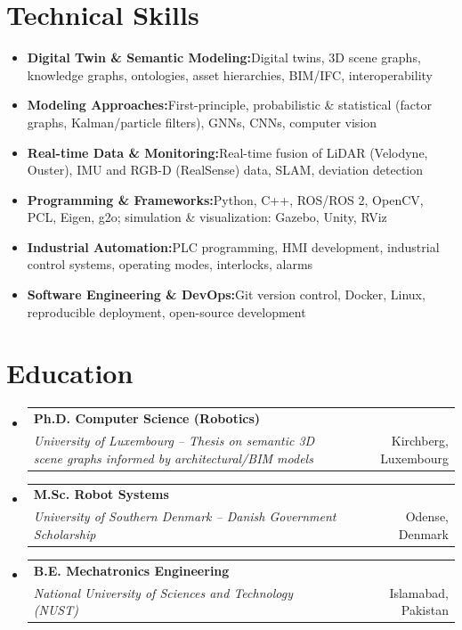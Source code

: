 \documentclass[a4paper,11pt]{article}
\makeatletter
\newcommand{\resumeItem}[2]{
  \item{
    \textbf{#1}{\hspace{1mm}#2 \vspace{-0.5mm}}
  }
}
\newcommand{\resumeSubheading}[4]{
\vspace{0.5mm}\item
    \begin{tabular*}{0.98\textwidth}[t]{l@{\extracolsep{\fill}}r}
        \textbf{#1} & \textit{\footnotesize{#4}} \\
        \textit{\footnotesize{#3}} &  \footnotesize{#2}\\
    \end{tabular*}
    \vspace{-2.4mm}
}
\newcommand{\resumeSubItem}[2]{\resumeItem{#1}{#2}\vspace{-4pt}}
\newcommand{\resumeSubHeadingListStart}{\begin{itemize}[leftmargin=*,labelsep=1mm]}
\newcommand{\resumeHeadingSkillStart}{\begin{itemize}[leftmargin=*,itemsep=1mm, rightmargin=2ex]}
\newcommand{\resumeSubHeadingListEnd}{\end{itemize}\vspace{2mm}}
\newcommand{\resumeHeadingSkillEnd}{\end{itemize}\vspace{-2mm}}
\makeatother
\begin{document}
\section{\textbf{Technical Skills}}
\vspace{-0.2mm}
\resumeHeadingSkillStart
  \resumeSubItem{Digital Twin \& Semantic Modeling:}
    {Digital twins, 3D scene graphs, knowledge graphs, ontologies, asset hierarchies, BIM/IFC, interoperability}
  \resumeSubItem{Modeling Approaches:}
    {First-principle, probabilistic \& statistical (factor graphs, Kalman/particle filters), GNNs, CNNs, computer vision}
  \resumeSubItem{Real-time Data \& Monitoring:}
    {Real-time fusion of LiDAR (Velodyne, Ouster), IMU and RGB-D (RealSense) data, SLAM, deviation detection}
  \resumeSubItem{Programming \& Frameworks:}
    {Python, C++, ROS/ROS 2, OpenCV, PCL, Eigen, g2o; simulation \& visualization: Gazebo, Unity, RViz}
  \resumeSubItem{Industrial Automation:}
    {PLC programming, HMI development, industrial control systems, operating modes, interlocks, alarms}
  \resumeSubItem{Software Engineering \& DevOps:}
    {Git version control, Docker, Linux, reproducible deployment, open-source development}
\resumeHeadingSkillEnd

\section{\textbf{Education}}
\vspace{-0.4mm}
\resumeSubHeadingListStart
\resumeSubheading
{Ph.D. Computer Science (Robotics)}{Kirchberg, Luxembourg}
{University of Luxembourg -- Thesis on semantic 3D scene graphs informed by architectural/BIM models}{}
\resumeSubheading
{M.Sc. Robot Systems}{Odense, Denmark}
{University of Southern Denmark -- Danish Government Scholarship}{}
\resumeSubheading
{B.E. Mechatronics Engineering}{Islamabad, Pakistan}
{National University of Sciences and Technology (NUST)}{}
\resumeSubHeadingListEnd
\vspace{-4mm}
\end{document}
